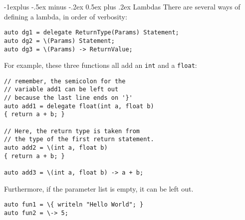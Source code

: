 \documentclass[a4paper,10pt,landscape]{article}
\makeatletter
\newenvironment{segment}[1]
{\begin{mdframed}[roundcorner=5pt]\subsection{#1}}
{\end{mdframed}\vspace{2pt plus 5pt}}
\renewcommand{\subsection}{\@startsection{subsection}{2}{0mm}%
			      {-1explus -.5ex minus -.2ex}%
			      {0.5ex plus .2ex}%
			      {\normalfont\normalsize\bfseries}}
\makeatother
\begin{document}
\begin{multicols}{3}
\begin{segment}{Lambdas}
There are several ways of defining a lambda, in order of verbosity:

\begin{lstlisting}
auto dg1 = delegate ReturnType(Params) Statement;
auto dg2 = \(Params) Statement;
auto dg3 = \(Params) -> ReturnValue;
\end{lstlisting}

For example, these three functions all add an \texttt{int} and a \texttt{float}:

\begin{lstlisting}
// remember, the semicolon for the
// variable add1 can be left out
// because the last line ends on '}'
auto add1 = delegate float(int a, float b)
{ return a + b; }

// Here, the return type is taken from
// the type of the first return statement.
auto add2 = \(int a, float b)
{ return a + b; }

auto add3 = \(int a, float b) -> a + b;
\end{lstlisting}

Furthermore, if the parameter list is empty, it can be left out.

\begin{lstlisting}
auto fun1 = \{ writeln "Hello World"; }
auto fun2 = \-> 5;
\end{lstlisting}

\end{segment}

\end{multicols}
\end{document}
